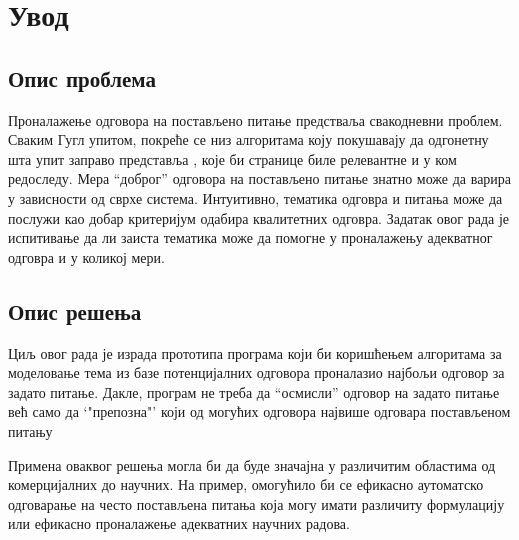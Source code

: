 \chapter{Увод}


\section{Опис проблема}

Проналажење одговора на постављено питање предстваља  свакодневни проблем. Сваким Гугл упитом, покреће се низ алгоритама коју покушавају да одгонетну шта упит заправо представља , које би странице биле релевантне и у ком редоследу. 
Мера "`доброг"' одговора на постављено питање знатно може да варира у зависности од сврхе система. Интуитивно, тематика одговра и питања може да послужи као добар критеријум одабира квалитетних одговра. Задатак овог рада је испитивање да ли заиста тематика може да помогне у проналажењу адекватног одговра и у коликој мери.



\section{Опис решења}


Циљ овог рада је израда прототипа програма који би коришћењем алгоритама за моделовање тема из базе потенцијалних одговора проналазио најбољи одговор за задато питање. Дакле, програм не треба да "`осмисли"' одговор на задато питање већ само да `"препозна"' који од могућих одговора највише одговара постављеном питању 

Примена оваквог решења могла би да буде значајна у различитим областима од комерцијалних до научних. На пример, омогућило би се ефикасно аутоматско одговарање на често постављена питања која могу имати различиту формулацију или ефикасно проналажење адекватних научних радова. 

